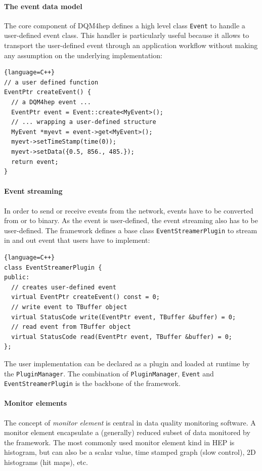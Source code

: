 \documentclass{webofc}
\begin{document}
\paragraph{The event data model}

The core component of DQM4hep defines a high level class \texttt{Event} to handle a user-defined event class. This handler is particularly useful because it allows to transport the user-defined event through an application workflow without making any assumption on the underlying implementation:

\begin{lstlisting}{language=C++}
// a user defined function
EventPtr createEvent() {
  // a DQM4hep event ...
  EventPtr event = Event::create<MyEvent>();
  // ... wrapping a user-defined structure
  MyEvent *myevt = event->get<MyEvent>();
  myevt->setTimeStamp(time(0));
  myevt->setData({0.5, 856., 485.});
  return event;
}
\end{lstlisting}

\paragraph{Event streaming}

In order to send or receive events from the network, events have to be converted from or to binary. As the event is user-defined, the event streaming also has to be user-defined. The framework defines a base class \texttt{EventStreamerPlugin} to stream in and out event that users have to implement:

\begin{lstlisting}{language=C++}
class EventStreamerPlugin {
public:
  // creates user-defined event
  virtual EventPtr createEvent() const = 0;
  // write event to TBuffer object
  virtual StatusCode write(EventPtr event, TBuffer &buffer) = 0;
  // read event from TBuffer object
  virtual StatusCode read(EventPtr event, TBuffer &buffer) = 0;
};
\end{lstlisting}

The user implementation can be declared as a plugin and loaded at runtime by the \texttt{PluginManager}. The combination of \texttt{PluginManager}, \texttt{Event} and \texttt{EventStreamerPlugin} is the backbone of the framework.

\paragraph{Monitor elements}

The concept of \textit{monitor element} is central in data quality monitoring software. A monitor element encapsulate a (generally) reduced subset of data monitored by the framework. The most commonly used monitor element kind in HEP is histogram, but can also be a scalar value, time stamped graph (slow control), 2D histograms (hit maps), etc.
\end{document}
